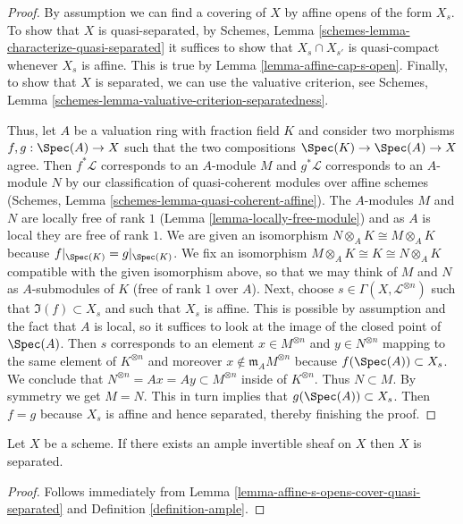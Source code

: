 \begin{proof}
By assumption we can find a covering of $X$ by affine opens of the form $X_s$.
To show that $X$ is quasi-separated, by
Schemes, Lemma \ref{schemes-lemma-characterize-quasi-separated}
it suffices to show that $X_s \cap X_{s'}$ is quasi-compact
whenever $X_s$ is affine. This is true by Lemma \ref{lemma-affine-cap-s-open}.
Finally, to show that $X$ is separated, we can use the valuative criterion,
see Schemes, Lemma \ref{schemes-lemma-valuative-criterion-separatedness}.

\medskip\noindent
Thus, let $A$ be a valuation ring with fraction field $K$ and
consider two morphisms $f, g : \Spec(A) \to X$ such that
the two compositions $\Spec(K) \to \Spec(A) \to X$ agree.
Then $f^*\mathcal{L}$ corresponds to an $A$-module $M$ and
$g^*\mathcal{L}$ corresponds to an $A$-module $N$ by our classification
of quasi-coherent modules over affine schemes
(Schemes, Lemma \ref{schemes-lemma-quasi-coherent-affine}).
The $A$-modules $M$ and $N$ are locally free of rank $1$
(Lemma \ref{lemma-locally-free-module}) and as $A$ is local
they are free of rank $1$. We are given an isomorphism
$N \otimes_A K \cong M \otimes_A K$ because $f|_{\Spec(K)} = g|_{\Spec(K)}$.
We fix an isomorphism $M \otimes_A K \cong K \cong N \otimes_A K$
compatible with the given isomorphism above, so that we may
think of $M$ and $N$ as $A$-submodules of $K$ (free of rank $1$ over $A$).
Next, choose $s \in \Gamma(X, \mathcal{L}^{\otimes n})$ such that
$\Im(f) \subset X_s$ and such that $X_s$ is affine.
This is possible by assumption and the fact that $A$ is local, so it
suffices to look at the image of the closed point of $\Spec(A)$.
Then $s$ corresponds to an element $x \in M^{\otimes n}$ and
$y \in N^{\otimes n}$ mapping to the same element of $K^{\otimes n}$
and moreover $x \not \in \mathfrak m_A M^{\otimes n}$ because
$f(\Spec(A)) \subset X_s$. We conclude that
$N^{\otimes n} = Ax = Ay \subset M^{\otimes n}$ inside of $K^{\otimes n}$.
Thus $N \subset M$. By symmetry we get $M = N$. This in turn implies
that $g(\Spec(A)) \subset X_s$. Then $f = g$ because $X_s$ is affine
and hence separated, thereby finishing the proof.
\end{proof}

\begin{lemma}
\label{lemma-ample-separated}
Let $X$ be a scheme. If there exists an ample invertible sheaf on $X$
then $X$ is separated.
\end{lemma}

\begin{proof}
Follows immediately from
Lemma \ref{lemma-affine-s-opens-cover-quasi-separated} and
Definition \ref{definition-ample}.
\end{proof}

